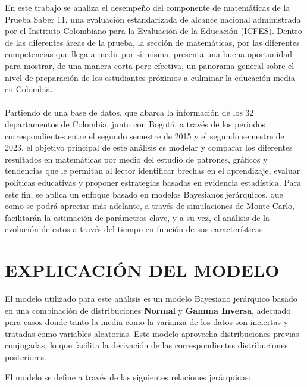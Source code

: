 \documentclass[12pt]{article}
\begin{document}
En este trabajo se analiza el desempeño del componente de matemáticas de la Prueba Saber 11, una evaluación estandarizada de alcance nacional administrada por el Instituto Colombiano para la Evaluación de la Educación (ICFES). Dentro de las diferentes áreas de la prueba, la sección de matemáticas, por las diferentes competencias que llega a medir por sí misma, presenta una buena oportunidad para mostrar, de una manera corta pero efectiva, un panorama general sobre el nivel de preparación de los estudiantes próximos a culminar la educación media en Colombia.\\\\
Partiendo de una base de datos, que abarca la información de los 32 departamentos de Colombia, junto con Bogotá, a través de los periodos correspondientes entre el segundo semestre de 2015 y el segundo semestre de 2023, el objetivo principal de este análisis es modelar y comparar los diferentes resultados en matemáticas por medio del estudio de patrones, gráficos y tendencias que le permitan al lector identificar brechas en el aprendizaje, evaluar políticas educativas y proponer estrategias basadas en evidencia estadística. Para este fin, se aplica un enfoque basado en modelos Bayesianos jerárquicos, que como se podrá apreciar más adelante, a través de simulaciones de Monte Carlo, facilitarán la estimación de parámetros clave, y a su vez, el análisis de la evolución de estos a través del tiempo en función de sus características.



\section{EXPLICACIÓN DEL MODELO}

El modelo utilizado para este análisis es un modelo Bayesiano jerárquico basado en una combinación de distribuciones \textbf{Normal} y \textbf{Gamma Inversa}, adecuado para casos donde tanto la media como la varianza de los datos son inciertas y tratadas como variables aleatorias. Este modelo aprovecha distribuciones previas conjugadas, lo que facilita la derivación de las correspondientes distribuciones posteriores.  

El modelo se define a través de las siguientes relaciones jerárquicas:  
\end{document}
